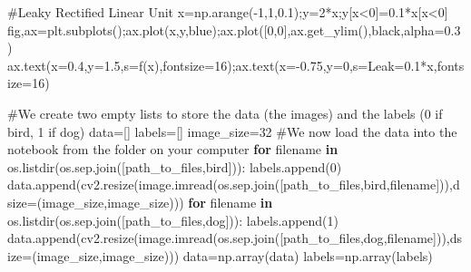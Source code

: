 \documentclass[
  letterpaper,
  DIV=11,
  numbers=noendperiod]{scrartcl}
\newenvironment{Shaded}{\begin{snugshade}}{\end{snugshade}}
\newcommand{\CommentTok}[1]{\textcolor[rgb]{0.37,0.37,0.37}{#1}}
\newcommand{\ControlFlowTok}[1]{\textcolor[rgb]{0.00,0.23,0.31}{\textbf{#1}}}
\newcommand{\DecValTok}[1]{\textcolor[rgb]{0.68,0.00,0.00}{#1}}
\newcommand{\FloatTok}[1]{\textcolor[rgb]{0.68,0.00,0.00}{#1}}
\newcommand{\KeywordTok}[1]{\textcolor[rgb]{0.00,0.23,0.31}{\textbf{#1}}}
\newcommand{\NormalTok}[1]{\textcolor[rgb]{0.00,0.23,0.31}{#1}}
\newcommand{\OperatorTok}[1]{\textcolor[rgb]{0.37,0.37,0.37}{#1}}
\newcommand{\StringTok}[1]{\textcolor[rgb]{0.13,0.47,0.30}{#1}}
\begin{document}
\begin{Shaded}
\begin{Highlighting}[]
\CommentTok{\#Leaky Rectified Linear Unit}
\NormalTok{x}\OperatorTok{=}\NormalTok{np.arange(}\OperatorTok{{-}}\DecValTok{1}\NormalTok{,}\DecValTok{1}\NormalTok{,}\FloatTok{0.1}\NormalTok{)}\OperatorTok{;}\NormalTok{y}\OperatorTok{=}\DecValTok{2}\OperatorTok{*}\NormalTok{x}\OperatorTok{;}\NormalTok{y[x}\OperatorTok{\textless{}}\DecValTok{0}\NormalTok{]}\OperatorTok{=}\FloatTok{0.1}\OperatorTok{*}\NormalTok{x[x}\OperatorTok{\textless{}}\DecValTok{0}\NormalTok{]}
\NormalTok{fig,ax}\OperatorTok{=}\NormalTok{plt.subplots()}\OperatorTok{;}\NormalTok{ax.plot(x,y,}\StringTok{\textquotesingle{}blue\textquotesingle{}}\NormalTok{)}\OperatorTok{;}\NormalTok{ax.plot([}\DecValTok{0}\NormalTok{,}\DecValTok{0}\NormalTok{],ax.get\_ylim(),}\StringTok{\textquotesingle{}black\textquotesingle{}}\NormalTok{,alpha}\OperatorTok{=}\FloatTok{0.3}\NormalTok{)}
\NormalTok{ax.text(x}\OperatorTok{=}\FloatTok{0.4}\NormalTok{,y}\OperatorTok{=}\FloatTok{1.5}\NormalTok{,s}\OperatorTok{=}\StringTok{\textquotesingle{}f(x)\textquotesingle{}}\NormalTok{,fontsize}\OperatorTok{=}\DecValTok{16}\NormalTok{)}\OperatorTok{;}\NormalTok{ax.text(x}\OperatorTok{={-}}\FloatTok{0.75}\NormalTok{,y}\OperatorTok{=}\DecValTok{0}\NormalTok{,s}\OperatorTok{=}\StringTok{\textquotesingle{}Leak=0.1*x\textquotesingle{}}\NormalTok{,fontsize}\OperatorTok{=}\DecValTok{16}\NormalTok{)}
\end{Highlighting}
\end{Shaded}

\begin{Shaded}
\begin{Highlighting}[]
\CommentTok{\#We create two empty lists to store the data (the images) and the labels (0 if bird, 1 if dog)}
\NormalTok{data}\OperatorTok{=}\NormalTok{[]}
\NormalTok{labels}\OperatorTok{=}\NormalTok{[]}
\NormalTok{image\_size}\OperatorTok{=}\DecValTok{32}
\CommentTok{\#We now load the data into the notebook from the folder on your computer}
\ControlFlowTok{for}\NormalTok{ filename }\KeywordTok{in}\NormalTok{ os.listdir(os.sep.join([path\_to\_files,}\StringTok{\textquotesingle{}bird\textquotesingle{}}\NormalTok{])):}
\NormalTok{    labels.append(}\DecValTok{0}\NormalTok{)}
\NormalTok{    data.append(cv2.resize(image.imread(os.sep.join([path\_to\_files,}\StringTok{\textquotesingle{}bird\textquotesingle{}}\NormalTok{,filename])),dsize}\OperatorTok{=}\NormalTok{(image\_size,image\_size)))}
\ControlFlowTok{for}\NormalTok{ filename }\KeywordTok{in}\NormalTok{ os.listdir(os.sep.join([path\_to\_files,}\StringTok{\textquotesingle{}dog\textquotesingle{}}\NormalTok{])):}
\NormalTok{    labels.append(}\DecValTok{1}\NormalTok{)}
\NormalTok{    data.append(cv2.resize(image.imread(os.sep.join([path\_to\_files,}\StringTok{\textquotesingle{}dog\textquotesingle{}}\NormalTok{,filename])),dsize}\OperatorTok{=}\NormalTok{(image\_size,image\_size)))}
\NormalTok{data}\OperatorTok{=}\NormalTok{np.array(data)}
\NormalTok{labels}\OperatorTok{=}\NormalTok{np.array(labels)}
\end{Highlighting}
\end{Shaded}
\end{document}
